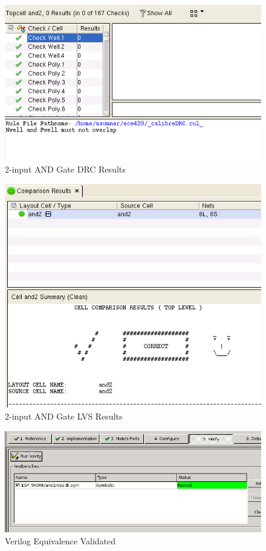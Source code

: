 \documentclass[12pt]{article}
\begin{document}
\begin{figure}[H]
\centering
\includegraphics[width=0.7\linewidth]{and2-drc}
\caption{2-input AND Gate DRC Results}
\label{fig:and2-drc}
\end{figure}

\begin{figure}[H]
\centering
\includegraphics[width=0.7\linewidth]{and2-lvs}
\caption{2-input AND Gate LVS Results}
\label{fig:and2-lvs}
\end{figure}


\begin{figure}[H]
\centering
\includegraphics[width=0.7\linewidth]{verilog-verified}
\caption{Verilog Equivalence Validated}
\label{fig:verilog-verified}
\end{figure}
\end{document}
